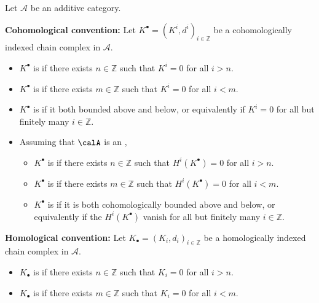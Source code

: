 \begin{definition} \label{definition:bounded_complexes_on_an_additive_category_and_homologically_bounded_objects_on_an_abelian_category}
Let $\mathcal{A}$ be an additive category.

\noindent\textbf{Cohomological convention:} Let $K^\bullet = (K^i, d^i)_{i \in \mathbb{Z}}$ be a cohomologically indexed chain complex in $\mathcal{A}$.
\begin{itemize}
    \item $K^\bullet$ is  if there exists $n \in \mathbb{Z}$ such that $K^i = 0$ for all $i > n$.
    \item $K^\bullet$ is  if there exists $m \in \mathbb{Z}$ such that $K^i = 0$ for all $i < m$.
    \item $K^\bullet$ is  if it both bounded above and below, or equivalently if $K^i = 0$ for all but finitely many $i \in \mathbb{Z}$.
    \item Assuming that $\calA$ is an , 
    \begin{itemize}
        \item $K^\bullet$ is  if there exists $n \in \mathbb{Z}$ such that $H^i(K^\bullet) = 0$ for all $i > n$.
        \item $K^\bullet$ is  if there exists $m \in \mathbb{Z}$ such that $H^i(K^\bullet) = 0$ for all $i < m$.
        \item $K^\bullet$ is  if it is both cohomologically bounded above and below, or equivalently if the  $H^i(K^\bullet)$ vanish for all but finitely many $i \in \mathbb{Z}$.
    \end{itemize}
\end{itemize}

\noindent\textbf{Homological convention:} Let $K_\bullet = (K_i, d_i)_{i \in \mathbb{Z}}$ be a homologically indexed chain complex in $\mathcal{A}$.
\begin{itemize}
    \item $K_\bullet$ is  if there exists $n \in \mathbb{Z}$ such that $K_i = 0$ for all $i > n$.
    \item $K_\bullet$ is  if there exists $m \in \mathbb{Z}$ such that $K_i = 0$ for all $i < m$.


\end{itemize}
\end{definition}
